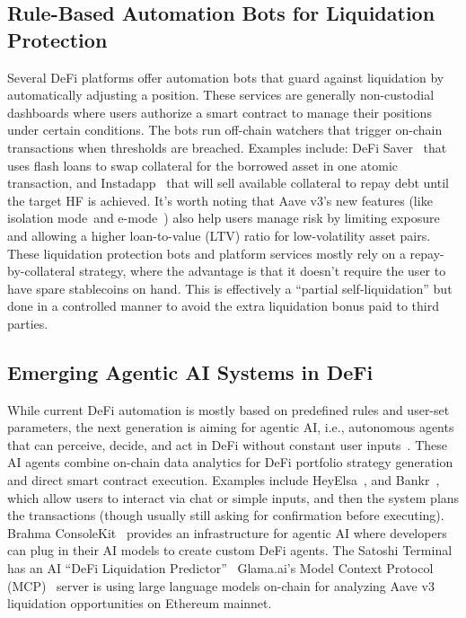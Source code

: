 \documentclass[manuscript,screen,review]{acmart}
\begin{document}
\subsection{Rule-Based Automation Bots for Liquidation Protection}

Several DeFi platforms offer automation bots that guard against liquidation by automatically adjusting a position. These services are generally non-custodial dashboards where users authorize a smart contract to manage their positions under certain conditions. The bots run off-chain watchers that trigger on-chain transactions when thresholds are breached. Examples include: DeFi Saver~\cite{defisaver_lending_borrowing} that uses flash loans to swap collateral for the borrowed asset in one atomic transaction, and Instadapp~\cite{instadapp_2026} that will sell available collateral to repay debt until the target HF is achieved. It's worth noting that Aave v3's new features (like isolation mode~\cite{aave_isolation_mode}and e-mode~\cite{aave_emode}) also help users manage risk by limiting exposure and allowing a higher loan-to-value (LTV) ratio for low-volatility asset pairs. These liquidation protection bots and platform services mostly rely on a repay-by-collateral strategy, where the advantage is that it doesn't require the user to have spare stablecoins on hand. This is effectively a ``partial self-liquidation'' but done in a controlled manner to avoid the extra liquidation bonus paid to third parties.

\subsection{Emerging Agentic AI Systems in DeFi}

While current DeFi automation is mostly based on predefined rules and user-set parameters, the next generation is aiming for agentic AI, i.e., autonomous agents that can perceive, decide, and act in DeFi without constant user inputs~\cite{agentfi_101}. These AI agents combine on-chain data analytics for DeFi portfolio strategy generation and direct smart contract execution. Examples include HeyElsa~\cite{heyelsa_ai}, and Bankr~\cite{bankr_bot}, which allow users to interact via chat or simple inputs, and then the system plans the transactions (though usually still asking for confirmation before executing). Brahma ConsoleKit~\cite{brahma_consolekit_2025} provides an infrastructure for agentic AI where developers can plug in their AI models to create custom DeFi agents. The Satoshi Terminal has an AI ``DeFi Liquidation Predictor''~\cite{satoshiterminal_liquidation_predictors} Glama.ai's Model Context Protocol (MCP)~\cite{clumsynonono_aave_mcp} server is using large language models on-chain for analyzing Aave v3 liquidation opportunities on Ethereum mainnet. 
\end{document}
